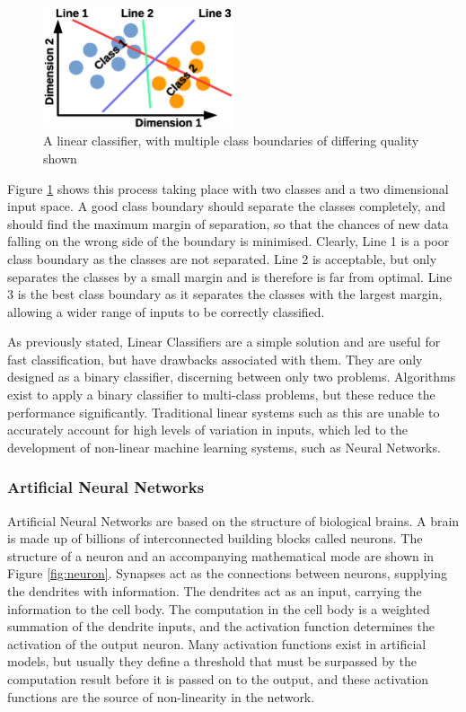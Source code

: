 \documentclass[12pt]{article}
\begin{document}
\begin{figure}[H]
\centering
\includegraphics[width=0.5\textwidth]{figures/SVM.eps}
\caption{A linear classifier, with multiple class boundaries of differing quality shown}
\label{fig:SVM}
\end{figure}

Figure \ref{fig:SVM} shows this process taking place with two classes and a two dimensional input space. A good class boundary should separate the classes completely, and should find the maximum margin of separation, so that the chances of new data falling on the wrong side of the boundary is minimised. Clearly, Line 1 is a poor class boundary as the classes are not separated. Line 2 is acceptable, but only separates the classes by a small margin and is therefore is far from optimal. Line 3 is the best class boundary as it separates the classes with the largest margin, allowing a wider range of inputs to be correctly classified.

As previously stated, Linear Classifiers are a simple solution and are useful for fast classification, but have drawbacks associated with them. They are only designed as a binary classifier, discerning between only two problems. Algorithms exist to apply a binary classifier to multi-class problems, but these reduce the performance significantly. Traditional linear systems such as this are unable to accurately account for high levels of variation in inputs, which led to the development of non-linear machine learning systems, such as Neural Networks.

\subsubsection{Artificial Neural Networks}
\label{sec:Background-ML-NN}

Artificial Neural Networks are based on the structure of biological brains. A brain is made up of billions of interconnected building blocks called neurons. The structure of a neuron and an accompanying mathematical mode are shown in Figure \ref{fig:neuron}. Synapses act as the connections between neurons, supplying the dendrites with information. The dendrites act as an input, carrying the information to the cell body. The computation in the cell body is a weighted summation of the dendrite inputs, and the activation function determines the activation of the output neuron\cite{neuron}. Many activation functions exist in artificial models, but usually they define a threshold that must be surpassed by the computation result before it is passed on to the output, and these activation functions are the source of non-linearity in the network.
\end{document}
